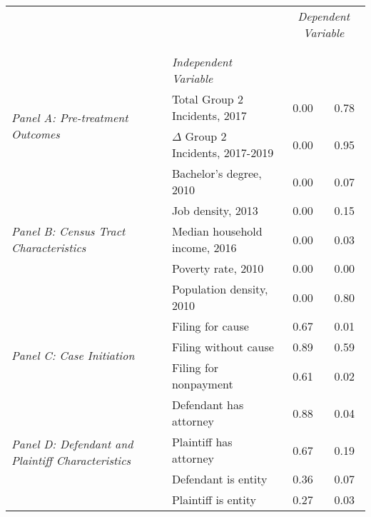 \begin{tabular}{llcc}
\toprule
 &  & \multicolumn{2}{c}{\textit{Dependent Variable}} \\
\cline{3-4}
\\
 &  &  &  \\
 & \emph{Independent Variable} &  &  \\
\midrule
\multirow[c]{2}{3cm}{\textit{Panel A: Pre-treatment Outcomes}} & Total Group 2 Incidents, 2017 & 0.00 & 0.78 \\
 & $\Delta$ Group 2 Incidents, 2017-2019 & 0.00 & 0.95 \\
\cline{1-4}
\multirow[c]{5}{3cm}{\textit{Panel B: Census Tract Characteristics}} & Bachelor's degree, 2010 & 0.00 & 0.07 \\
 & Job density, 2013 & 0.00 & 0.15 \\
 & Median household income, 2016 & 0.00 & 0.03 \\
 & Poverty rate, 2010 & 0.00 & 0.00 \\
 & Population density, 2010 & 0.00 & 0.80 \\
\cline{1-4}
\multirow[c]{3}{3cm}{\textit{Panel C: Case Initiation}} & Filing for cause & 0.67 & 0.01 \\
 & Filing without cause & 0.89 & 0.59 \\
 & Filing for nonpayment & 0.61 & 0.02 \\
\cline{1-4}
\multirow[c]{4}{3cm}{\textit{Panel D: Defendant and Plaintiff Characteristics}} & Defendant has attorney & 0.88 & 0.04 \\
 & Plaintiff has attorney & 0.67 & 0.19 \\
 & Defendant is entity & 0.36 & 0.07 \\
 & Plaintiff is entity & 0.27 & 0.03 \\
\cline{1-4}
\bottomrule
\end{tabular}
